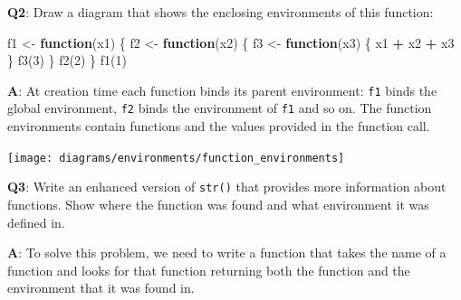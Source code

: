 \documentclass[
]{krantz}
\makeatletter
\newenvironment{Shaded}{\begin{snugshade}}{\end{snugshade}}
\newcommand{\ControlFlowTok}[1]{\textcolor[rgb]{0.13,0.29,0.53}{\textbf{#1}}}
\newcommand{\DecValTok}[1]{\textcolor[rgb]{0.00,0.00,0.81}{#1}}
\newcommand{\KeywordTok}[1]{\textcolor[rgb]{0.13,0.29,0.53}{\textbf{#1}}}
\newcommand{\NormalTok}[1]{#1}
\newcommand{\OperatorTok}[1]{\textcolor[rgb]{0.81,0.36,0.00}{\textbf{#1}}}
\newcommand{\StringTok}[1]{\textcolor[rgb]{0.31,0.60,0.02}{#1}}
\newenvironment{kframe}{%
\medskip{}
\setlength{\fboxsep}{.8em}
 \def\at@end@of@kframe{}%
 \ifinner\ifhmode%
  \def\at@end@of@kframe{\end{minipage}}%
  \begin{minipage}{\columnwidth}%
 \fi\fi%
 \def\FrameCommand##1{\hskip\@totalleftmargin \hskip-\fboxsep
 \colorbox{shadecolor}{##1}\hskip-\fboxsep
     \hskip-\linewidth \hskip-\@totalleftmargin \hskip\columnwidth}%
 \MakeFramed {\advance\hsize-\width
   \@totalleftmargin\z@ \linewidth\hsize
   \@setminipage}}%
 {\par\unskip\endMakeFramed%
 \at@end@of@kframe}
\renewenvironment{Shaded}{\begin{kframe}}{\end{kframe}}
\renewcommand{\KeywordTok} [1]{\textcolor[rgb]{0.00,0.44,0.13}{{#1}}}
\renewcommand{\DecValTok}  [1]{\textcolor[rgb]{0.25,0.63,0.44}{{#1}}}
\renewcommand{\StringTok}  [1]{\textcolor[rgb]{0.25,0.44,0.63}{{#1}}}
\renewcommand{\NormalTok}  [1]{{#1}}
\makeatother
\begin{document}
\textbf{{Q2}}: Draw a diagram that shows the enclosing environments of this function:

\begin{Shaded}
\begin{Highlighting}[]
\NormalTok{f1 <-}\StringTok{ }\ControlFlowTok{function}\NormalTok{(x1) \{}
\NormalTok{  f2 <-}\StringTok{ }\ControlFlowTok{function}\NormalTok{(x2) \{}
\NormalTok{    f3 <-}\StringTok{ }\ControlFlowTok{function}\NormalTok{(x3) \{}
\NormalTok{      x1 }\OperatorTok{+}\StringTok{ }\NormalTok{x2 }\OperatorTok{+}\StringTok{ }\NormalTok{x3}
\NormalTok{    \}}
    \KeywordTok{f3}\NormalTok{(}\DecValTok{3}\NormalTok{)}
\NormalTok{  \}}
  \KeywordTok{f2}\NormalTok{(}\DecValTok{2}\NormalTok{)}
\NormalTok{\}}
\KeywordTok{f1}\NormalTok{(}\DecValTok{1}\NormalTok{)}
\end{Highlighting}
\end{Shaded}

\textbf{{A}}: At creation time each function binds its parent environment: \texttt{f1} binds the global environment, \texttt{f2} binds the environment of \texttt{f1} and so on. The function environments contain functions and the values provided in the function call.

\begin{center}\texttt{[image: diagrams/environments/function\_environments]} \end{center}

\textbf{{Q3}}: Write an enhanced version of \texttt{str()} that provides more information about functions. Show where the function was found and what environment it was defined in.

\textbf{{A}}: To solve this problem, we need to write a function that takes the name of a function and looks for that function returning both the function and the environment that it was found in.
\end{document}
